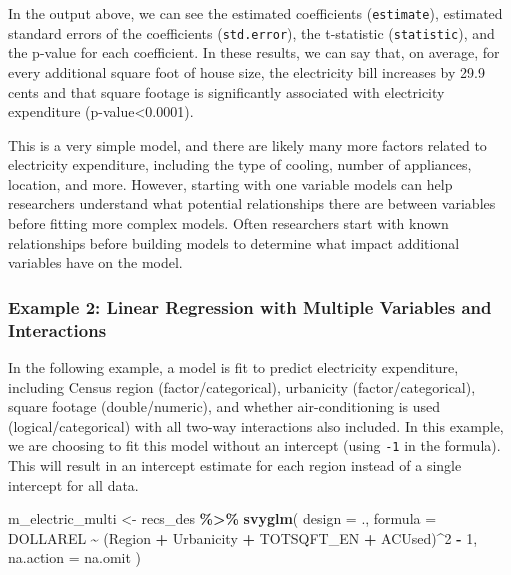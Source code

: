 \documentclass[
]{krantz}
\makeatletter
\newenvironment{Shaded}{\begin{snugshade}}{\end{snugshade}}
\newcommand{\AttributeTok}[1]{\textcolor[rgb]{0.27,0.27,0.27}{#1}}
\newcommand{\DecValTok}[1]{\textcolor[rgb]{0.06,0.06,0.06}{#1}}
\newcommand{\FunctionTok}[1]{\textcolor[rgb]{0.27,0.27,0.27}{\textbf{#1}}}
\newcommand{\NormalTok}[1]{#1}
\newcommand{\OtherTok}[1]{\textcolor[rgb]{0.37,0.37,0.37}{#1}}
\newcommand{\SpecialCharTok}[1]{\textcolor[rgb]{0.43,0.43,0.43}{\textbf{#1}}}
\newenvironment{kframe}{%
\medskip{}
\setlength{\fboxsep}{.8em}
 \def\at@end@of@kframe{}%
 \ifinner\ifhmode%
  \def\at@end@of@kframe{\end{minipage}}%
  \begin{minipage}{\columnwidth}%
 \fi\fi%
 \def\FrameCommand##1{\hskip\@totalleftmargin \hskip-\fboxsep
 \colorbox{shadecolor}{##1}\hskip-\fboxsep
     \hskip-\linewidth \hskip-\@totalleftmargin \hskip\columnwidth}%
 \MakeFramed {\advance\hsize-\width
   \@totalleftmargin\z@ \linewidth\hsize
   \@setminipage}}%
 {\par\unskip\endMakeFramed%
 \at@end@of@kframe}
\renewenvironment{Shaded}{\begin{kframe}}{\end{kframe}}
\makeatother
\begin{document}
In the output above, we can see the estimated coefficients (\texttt{estimate}), estimated standard errors of the coefficients (\texttt{std.error}), the t-statistic (\texttt{statistic}), and the p-value for each coefficient. In these results, we can say that, on average, for every additional square foot of house size, the electricity bill increases by 29.9 cents and that square footage is significantly associated with electricity expenditure (p-value\textless0.0001).

This is a very simple model, and there are likely many more factors related to electricity expenditure, including the type of cooling, number of appliances, location, and more. However, starting with one variable models can help researchers understand what potential relationships there are between variables before fitting more complex models. Often researchers start with known relationships before building models to determine what impact additional variables have on the model.

\hypertarget{example-2-linear-regression-with-multiple-variables-and-interactions}{%
\subsubsection*{Example 2: Linear Regression with Multiple Variables and Interactions}\label{example-2-linear-regression-with-multiple-variables-and-interactions}}


In the following example, a model is fit to predict electricity expenditure, including Census region (factor/categorical), urbanicity (factor/categorical), square footage (double/numeric), and whether air-conditioning is used (logical/categorical) with all two-way interactions also included. In this example, we are choosing to fit this model without an intercept (using \texttt{-1} in the formula). This will result in an intercept estimate for each region instead of a single intercept for all data.

\begin{Shaded}
\begin{Highlighting}[]
\NormalTok{m\_electric\_multi }\OtherTok{\textless{}{-}}\NormalTok{ recs\_des }\SpecialCharTok{\%\textgreater{}\%}
  \FunctionTok{svyglm}\NormalTok{(}
    \AttributeTok{design =}\NormalTok{ .,}
    \AttributeTok{formula =}\NormalTok{ DOLLAREL }\SpecialCharTok{\textasciitilde{}}\NormalTok{ (Region }\SpecialCharTok{+}\NormalTok{ Urbanicity }\SpecialCharTok{+}\NormalTok{ TOTSQFT\_EN }\SpecialCharTok{+}\NormalTok{ ACUsed)}\SpecialCharTok{\^{}}\DecValTok{2} \SpecialCharTok{{-}} \DecValTok{1}\NormalTok{,}
    \AttributeTok{na.action =}\NormalTok{ na.omit}
\NormalTok{  )}
\end{Highlighting}
\end{Shaded}
\end{document}
